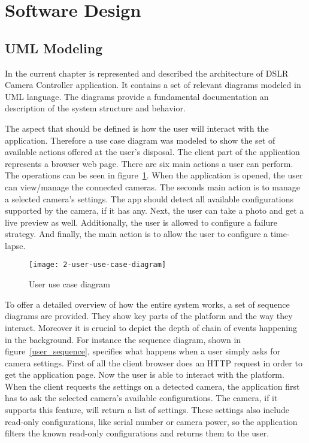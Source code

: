\section{Software Design}

\subsection{UML Modeling}
In the current chapter is represented and described the architecture of DSLR Camera Controller application. It contains a set of relevant diagrams modeled in UML language. The diagrams provide a fundamental documentation an description of the system structure and behavior.

The aspect that should be defined is how the user will interact with the application. Therefore a use case diagram was modeled to show the set of available actions offered at the user's disposal. The client part of the application represents a browser web page. There are six main actions a user can perform. The operations can be seen in \mbox{figure \ref{use_case}}. When the application is opened, the user can view/manage the connected cameras. The seconds main action is to manage a selected camera's settings. The app should detect all available configurations supported by the camera, if it has any. Next, the user can take a photo and get a live preview as well. Additionally, the user is allowed to configure a failure strategy. And finally, the main action is to allow the user to configure a time-lapse.

\begin{figure}[!ht]
\centering
\texttt{[image: 2-user-use-case-diagram]}
\caption{User use case diagram}\label{use_case}
\end{figure}

To offer a detailed overview of how the entire system works, a set of sequence diagrams are provided. They show key parts of the platform and the way they interact. Moreover it is crucial to depict the depth of chain of events happening in the background. For instance the sequence diagram, shown in \mbox{figure \ref{user_sequence}}, specifies what happens when a user simply asks for camera settings. First of all the client browser does an HTTP request in order to get the application page. Now the user is able to interact with the platform. When the client requests the settings on a detected camera, the application first has to ask the selected camera's available configurations. The camera, if it supports this feature, will return a list of settings. These settings also include read-only configurations, like serial number or camera power, so the application filters the known read-only configurations and returns them to the user.


